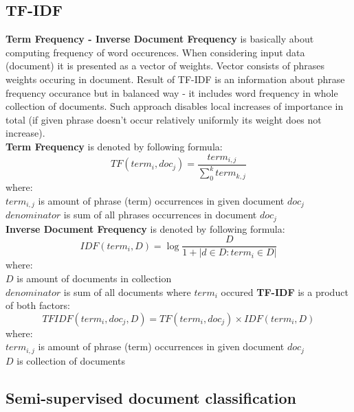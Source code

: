 \subsection{TF-IDF}
\textbf{Term Frequency - Inverse Document Frequency} is basically about computing frequency of word occurences. When considering input data (document) it is presented as a vector of weights. Vector consists of phrases weights occuring in document. Result of TF-IDF is an information about phrase frequency occurance but in balanced way - it includes word frequency in whole collection of documents. Such approach disables local increases of importance in total (if given phrase doesn't occur relatively uniformly its weight does not increase).\\ \textbf{Term Frequency} is denoted by following formula:
\begin{equation} 
TF(term_i,doc_j)=\frac{term_{i,j}}{\sum_{0}^{k}term_{k,j}}
\end{equation}
where:\\
$term_{i,j}$ is amount of phrase (term) occurrences in given document $doc_j$\\ 
$denominator$ is sum of all phrases occurrences in document $doc_j$
\\\newline\textbf{Inverse Document Frequency} is denoted by following formula:
\begin{equation}
IDF(term_i, D) =\log{\frac{D}{1+{|d\in D : term_i \in D|}}}
\end{equation}
where:\\
$D$ is amount of documents in collection\\ 
$denominator$ is sum of all documents where $term_i$ occured
\newline\textbf{TF-IDF} is a product of both factors:
\begin{equation}
TFIDF(term_i, doc_j, D) = TF(term_i,doc_j)\times IDF(term_i,D)
\end{equation}
where:\\
$term_{i,j}$ is amount of phrase (term) occurrences in given document $doc_j$\\
$D$ is collection of documents

\subsection{Semi-supervised document classification}



